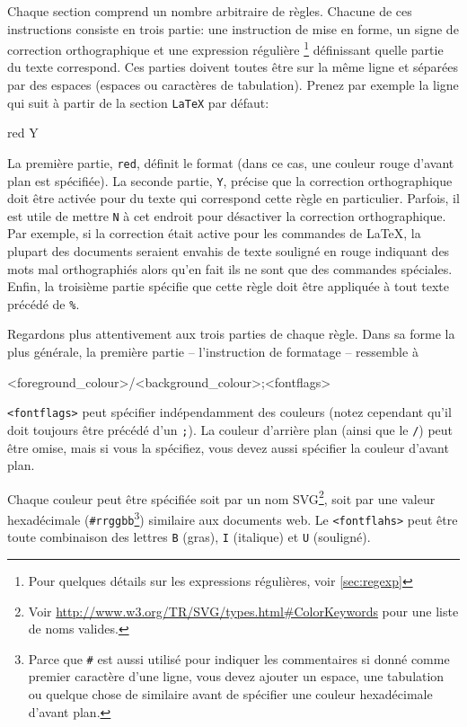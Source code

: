 Chaque section comprend un nombre arbitraire de règles. Chacune de ces instructions consiste en trois partie: une instruction de mise en forme, un signe de correction orthographique et une expression régulière \footnote{Pour quelques détails sur les expressions régulières, voir \ref{sec:regexp}} définissant quelle partie du texte correspond. Ces parties doivent toutes être sur la même ligne et séparées par des espaces (espaces ou caractères de tabulation). Prenez par exemple la ligne qui suit à partir de la section \verb|LaTeX| par défaut:
\begin{verbExample}
red    Y    %
\end{verbExample}
La première partie, \verb|red|, définit le format (dans ce cas, une couleur rouge d'avant plan est spécifiée). La seconde partie, \verb|Y|, précise que la correction orthographique doit être activée pour du texte qui correspond cette règle en particulier. Parfois, il est utile de mettre \verb|N| à cet endroit pour désactiver la correction orthographique. Par exemple, si la correction était active pour les commandes de \LaTeX, la plupart des documents seraient envahis de texte souligné en rouge indiquant des mots mal orthographiés alors qu'en fait ils ne sont que des commandes spéciales. Enfin, la troisième partie spécifie que cette règle doit être appliquée à tout texte précédé de \verb|%|.

Regardons plus attentivement aux trois parties de chaque règle. Dans sa forme la plus générale, la première partie -- l'instruction de formatage -- ressemble à
\begin{verbExample}
<foreground_colour>/<background_colour>;<fontflags>
\end{verbExample}
\verb|<fontflags>| peut spécifier indépendamment des couleurs (notez cependant qu'il doit toujours être précédé d'un \verb|;|). La couleur d'arrière plan (ainsi que le \verb|/|) peut être omise, mais si vous la spécifiez, vous devez aussi spécifier la couleur d'avant plan.

Chaque couleur peut être spécifiée soit par un nom SVG\footnote{Voir \url{http://www.w3.org/TR/SVG/types.html#ColorKeywords} pour une liste de noms valides.}, soit par une valeur hexadécimale (\verb|#rrggbb|\footnote{Parce que \verb|#| est aussi utilisé pour indiquer les commentaires si donné comme premier caractère d'une ligne, vous devez ajouter un espace, une tabulation ou quelque chose de similaire avant de spécifier une couleur hexadécimale d'avant plan.}) similaire aux documents web. Le \verb|<fontflahs>| peut être toute combinaison des lettres \verb|B| (gras), \verb|I| (italique) et \verb|U| (souligné).

